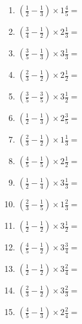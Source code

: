 \documentclass[12pt]{article}
\begin{document}
\begin{enumerate}
\item \large $ \left( \frac{1}{2} - \frac{1}{3} \right) \times 1 \frac{4}{5} = $ \vspace{1.6cm}
\item \large $ \left( \frac{3}{4} - \frac{1}{2} \right) \times 2 \frac{1}{3} = $ \vspace{1.6cm}
\item \large $ \left( \frac{3}{5} - \frac{1}{3} \right) \times 3 \frac{1}{3} = $ \vspace{1.6cm}
\item \large $ \left( \frac{2}{3} - \frac{1}{2} \right) \times 2 \frac{1}{2} = $ \vspace{1.6cm}
\item \large $ \left( \frac{3}{5} - \frac{3}{5} \right) \times 3 \frac{1}{2} = $ \vspace{1.6cm}
\item \large $ \left( \frac{1}{2} - \frac{1}{3} \right) \times 2 \frac{3}{5} = $ \vspace{1.6cm}
\newpage
\item \large $ \left( \frac{2}{3} - \frac{1}{2} \right) \times 1 \frac{1}{3} = $ \vspace{1.6cm}
\item \large $ \left( \frac{4}{5} - \frac{1}{5} \right) \times 2 \frac{1}{2} = $ \vspace{1.6cm}
\item \large $ \left( \frac{1}{2} - \frac{1}{4} \right) \times 3 \frac{1}{3} = $ \vspace{1.6cm}
\item \large $ \left( \frac{2}{3} - \frac{1}{5} \right) \times 1 \frac{2}{3} = $ \vspace{1.6cm}
\item \large $ \left( \frac{1}{2} - \frac{1}{2} \right) \times 3 \frac{1}{2} = $ \vspace{1.6cm}
\item \large $ \left( \frac{4}{5} - \frac{1}{2} \right) \times 3 \frac{3}{4} = $ \vspace{1.6cm}
\item \large $ \left( \frac{1}{2} - \frac{1}{2} \right) \times 3 \frac{2}{4} = $ \vspace{1.6cm}
\item \large $ \left( \frac{2}{3} - \frac{1}{2} \right) \times 3 \frac{2}{3} = $ \vspace{1.6cm}
\item \large $ \left( \frac{4}{5} - \frac{1}{3} \right) \times 2 \frac{2}{4} = $ \vspace{1.6cm}

\end{enumerate}
\end{document}
